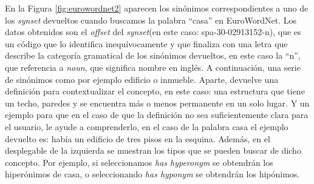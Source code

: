 En la Figura \ref{fig:eurowordnet2} aparecen los sinónimos correspondientes a uno de los \textit{synset} devueltos cuando buscamos la palabra ``casa'' en EuroWordNet. Los datos obtenidos son el \textit{offset} del \textit{synset}(en este caso: spa-30-02913152-n), que es un código que lo identifica inequívocamente y que finaliza con una letra que describe la categoría gramatical de los sinónimos devueltos, en este caso la ``n'', que referencia a \textit{noun}, que significa nombre en inglés. A continuación, una serie de sinónimos como por ejemplo edificio o inmueble. Aparte, devuelve una definición para contextualizar el concepto, en este caso: una estructura que tiene un techo, paredes y se encuentra más o menos permanente en un solo lugar. Y un ejemplo para que en el caso de que la definición no sea suficientemente clara para el usuario, le ayude a comprenderlo, en el caso de la palabra casa el ejemplo devuelto es: había un edificio de tres pisos en la esquina. Además, en el desplegable de la izquierda se muestran los tipos que se pueden buscar de dicho concepto. Por ejemplo, si seleccionamos \textit{has hyperonym} se obtendrán los hiperónimos de casa, o seleccionando \textit{has hyponym} se obtendrán los hipónimos.


